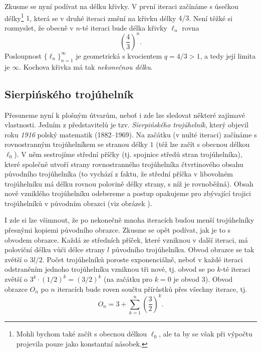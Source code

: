 Zkusme se nyní podívat na délku křivky. V první iteraci začínáme s úsečkou délky\footnote{Mohli bychom také začít s obecnou délkou $\ell_0$, ale ta by se však při výpočtu projevila pouze jako konstantní násobek.} $1$, která se v druhé iteraci změní na křivku délky $4/3$. Není těžké si rozmyslet, že obecně v $n$-té iteraci bude délka křivky $\ell_n$ rovna
\begin{equation*}
    \left(\dfrac{4}{3}\right)^{n}.
\end{equation*}
Posloupnost $\{\ell_n\}_{n=1}^{\infty}$ je geometrická s kvocientem $q=4/3>1$, a tedy její limita je $\infty$. Kochova křivka má tak \emph{nekonečnou délku}.

\subsection{Sierpińského trojúhelník}\label{subsec:sierpinskeho_trojuhelnik}
Přesuneme nyní k plošným útvarům, neboť i zde lze sledovat některé zajímavé vlastnosti. Jedním z představitelů je tzv. \emph{Sierpińského trojúhelník}, který objevil roku \emph{1916} polský matematik  \mbox{(1882--1969)}. \citep[str. 61]{Peitgen2004} Na začátku (v nulté iteraci) začínáme s rovnostranným trojúhelníkem se stranou délky $1$ (též lze začít s obecnou délkou $\ell_0$). V něm sestrojíme střední příčky (tj. spojnice středů stran trojúhelníka), které společně utvoří strany rovnostranného trojúhelníka čtvrtinového obsahu původního trojúhelníka (to vychází z faktu, že střední příčka v libovolném trojúhelníku má délku rovnou polovině délky strany, s níž je rovnoběžná). Obsah nově vzniklého trojúhelníku odebereme a postup opakujeme pro zbývající trojici trojúhelníků v původním obrazci (viz obrázek ).\par
{}\par
I zde si lze všimnout, že po nekonečně mnoha iteracích budou menší trojúhelníky přesnými kopiemi původního obrazce. Zkusme se opět podívat, jak je to s obvodem obrazce. Každá ze středních příček, které vzniknou v další iteraci, má poloviční délku vůči délce strany $l$ původního trojúhelníku. Obvod obrazce se tak zvětší o $3l/2$. Počet trojúhelníků poroste exponenciálně, neboť v každé iteraci odstraněním jednoho trojúhelníku vzniknou tři nové, tj. obvod se po $k$-té iteraci zvětší o $3^k\cdot(1/2)^k=(3/2)^k$ (na začátku pro $k=0$ je obvod $3$). Obvod obrazce $O_n$ po $n$ iteracích bude roven součtu přírůstků přes všechny iterace, tj.
\begin{equation}\label{eq:obvod_sierpinskeho_trojuhelniku_niteraci}
    O_n=3+\sum_{k=1}^n{\left(\dfrac{3}{2}\right)^k}.
\end{equation}
